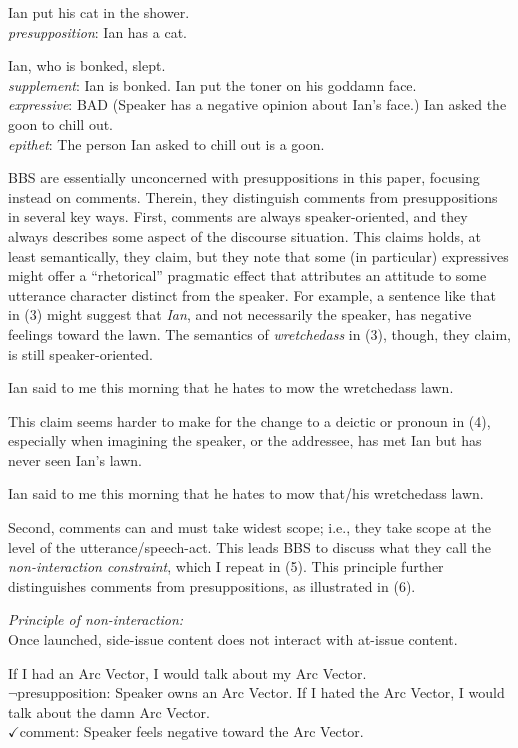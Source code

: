 \documentclass[12pt]{article}
\begin{document}
\ex Ian put his cat in the shower. \\ \textit{presupposition}: Ian has a cat.
\xe

\vspace*{-1em}\pex 
\a Ian, who is bonked, slept. \\ \textit{supplement}: Ian is bonked.
\a Ian put the toner on his goddamn face. \\ \textit{expressive}: BAD (Speaker has a negative opinion about Ian's face.)
\a Ian asked the goon to chill out. \\ \textit{epithet}: The person Ian asked to chill out is a goon.
\xe

BBS are essentially unconcerned with presuppositions in this paper, focusing instead on comments. Therein, they distinguish comments from presuppositions in several key ways. First, comments are always speaker-oriented, and they always describes some aspect of the discourse situation. This claims holds, at least semantically, they claim, but they note that some (in particular) expressives might offer a ``rhetorical'' pragmatic effect that attributes an attitude to some utterance character distinct from the speaker. For example, a sentence like that in (3) might suggest that \textit{Ian}, and not necessarily the speaker, has negative feelings toward the lawn. The semantics of \textit{wretchedass} in (3), though, they claim, is still speaker-oriented.

   
\ex Ian said to me this morning that he hates to mow the wretchedass lawn.
\xe

\noindent This claim seems harder to make for the change to a deictic or pronoun in (4), especially when imagining the speaker, or the addressee, has met Ian but has never seen Ian's lawn.

\ex Ian said to me this morning that he hates to mow that/his wretchedass lawn.
\xe

Second, comments can and must take widest scope; i.e., they take scope at the level of the utterance/speech-act. This leads BBS to discuss what they call the \textit{non-interaction constraint}, which I repeat in (5). This principle further distinguishes comments from presuppositions, as illustrated in (6).

\ex \textit{Principle of non-interaction:} \\ Once launched, side-issue content does not interact with at-issue content.
\xe 

\pex
\a If I had an Arc Vector, I would talk about my Arc Vector. \\ $\neg$presupposition: Speaker owns an Arc Vector.
\a If I hated the Arc Vector, I would talk about the damn Arc Vector. \\ $\checkmark$comment: Speaker feels negative toward the Arc Vector.
\xe
    
\end{document}
